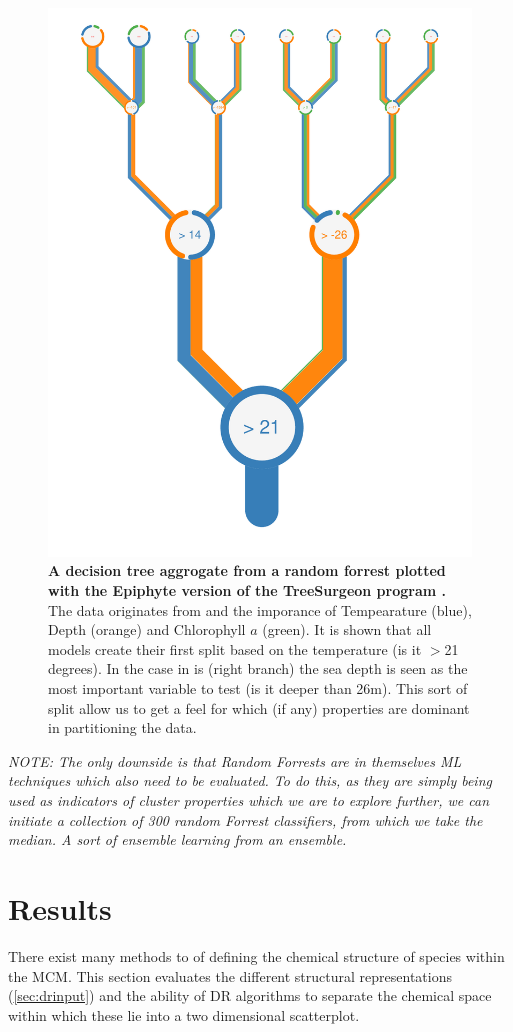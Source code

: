 \begin{figure}[H]
     \centering
         \includegraphics[width=.55\textwidth]{4fig/Oi_prj_features_of_RFR(TEMP+DEPTH+ChlrA)_for_depth_5_white.pdf}
        \caption{\textbf{A decision tree aggrogate from a random forrest plotted with the Epiphyte version of the TreeSurgeon program \citep{forrester}.} The data originates from \cite{iodene} and the imporance of Tempearature (blue), Depth (orange) and Chlorophyll $a$ (green). It is shown that all models create their first split based on the temperature (is it $>$21 degrees). In the case in is (right branch) the sea depth is seen as the most important variable to test (is it deeper than 26m). This sort of split allow us to get a feel for which (if any) properties are dominant in partitioning the data. }
        \label{fig:iodenetree}
\end{figure}


%

\textit{NOTE: The only downside is that Random Forrests are in themselves ML techniques which also need to be evaluated. To do this, as they are simply being used as indicators of cluster properties which we are to explore further, we can initiate a collection of 300 random Forrest classifiers, from which we take the median. A sort of ensemble learning from an ensemble. }


\section{Results}\label{sec:drres}
%
There exist many methods to of defining the chemical structure of species within the MCM. This section evaluates the different structural representations (\autoref{sec:drinput}) and the ability of DR algorithms to separate the chemical space within which these lie into a two dimensional scatterplot. 

